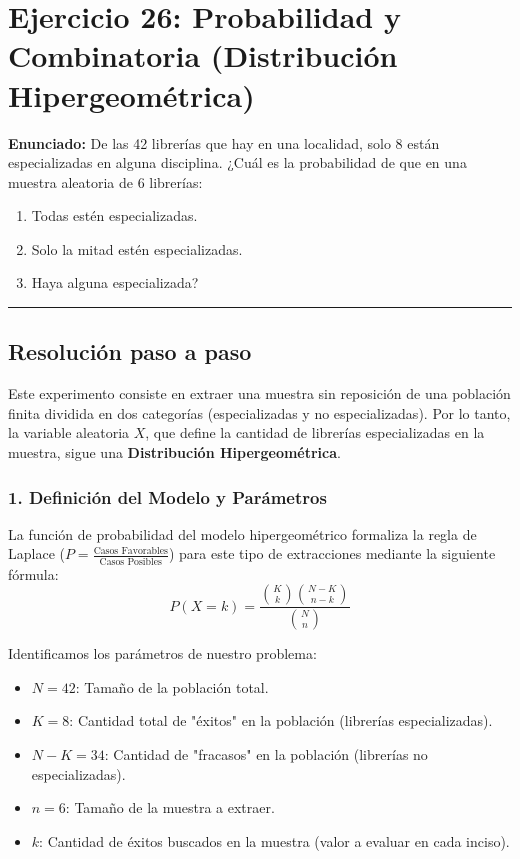 \documentclass[11pt,a4paper]{article}
\begin{document}
\section*{Ejercicio 26: Probabilidad y Combinatoria (Distribución Hipergeométrica)}

\textbf{Enunciado:} De las 42 librerías que hay en una localidad, solo 8 están especializadas en alguna disciplina. ¿Cuál es la probabilidad de que en una muestra aleatoria de 6 librerías:
\begin{enumerate}[label=\alph*)]
    \item Todas estén especializadas.
    \item Solo la mitad estén especializadas.
    \item Haya alguna especializada?
\end{enumerate}

\vspace{0.5cm}
\hrule
\vspace{0.5cm}

\subsection*{Resolución paso a paso}

Este experimento consiste en extraer una muestra sin reposición de una población finita dividida en dos categorías (especializadas y no especializadas). Por lo tanto, la variable aleatoria $X$, que define la cantidad de librerías especializadas en la muestra, sigue una \textbf{Distribución Hipergeométrica}.

\subsubsection*{1. Definición del Modelo y Parámetros}
La función de probabilidad del modelo hipergeométrico formaliza la regla de Laplace ($P = \frac{\text{Casos Favorables}}{\text{Casos Posibles}}$) para este tipo de extracciones mediante la siguiente fórmula:
$$ P(X = k) = \frac{\binom{K}{k} \binom{N-K}{n-k}}{\binom{N}{n}} $$

Identificamos los parámetros de nuestro problema:
\begin{itemize}
    \item $N = 42$: Tamaño de la población total.
    \item $K = 8$: Cantidad total de "éxitos" en la población (librerías especializadas).
    \item $N - K = 34$: Cantidad de "fracasos" en la población (librerías no especializadas).
    \item $n = 6$: Tamaño de la muestra a extraer.
    \item $k$: Cantidad de éxitos buscados en la muestra (valor a evaluar en cada inciso).
\end{itemize}
\end{document}

